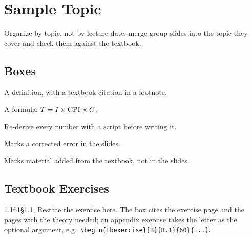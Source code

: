 \section{Sample Topic}
\label{sec:sample}

Organize by topic, not by lecture date; merge group slides into the topic they
cover and check them against the textbook.

\subsection{Boxes}

\begin{definition}[Term]
A definition, with a textbook citation in a footnote.
\end{definition}

\begin{theorem}[Result]
A formula: $T=I\times\mathrm{CPI}\times C$.
\end{theorem}

\begin{eg}
Re-derive every number with a script before writing it.
\end{eg}

\begin{remark}
\slidefix{} Marks a corrected error in the slides.
\end{remark}

\beyond{} Marks material added from the textbook, not in the slides.

\subsection{Textbook Exercises}

\begin{tbexercise}{1.1}{61}{\S1.1, }
Restate the exercise here. The box cites the exercise page and the pages with the
theory needed; an appendix exercise takes the letter as the optional argument,
e.g.\ \texttt{\textbackslash begin\{tbexercise\}[B]\{B.1\}\{60\}\{...\}}.
\end{tbexercise}
